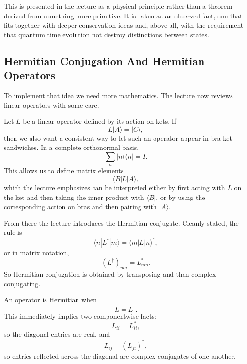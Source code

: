 This is presented in the lecture as a physical principle rather than a theorem derived from something more primitive. It is taken as an observed fact, one that fits together with deeper conservation ideas and, above all, with the requirement that quantum time evolution not destroy distinctions between states.

\subsection{Hermitian Conjugation And Hermitian Operators}

To implement that idea we need more mathematics. The lecture now reviews linear operators with some care.

Let $L$ be a linear operator defined by its action on kets. If
\begin{equation}
L|A\rangle=|C\rangle,
\end{equation}
then we also want a consistent way to let such an operator appear in bra-ket sandwiches. In a complete orthonormal basis,
\begin{equation}
\sum_n |n\rangle\langle n|=I.
\end{equation}
This allows us to define matrix elements
\begin{equation}
\langle B|L|A\rangle,
\end{equation}
which the lecture emphasizes can be interpreted either by first acting with $L$ on the ket and then taking the inner product with $\langle B|$, or by using the corresponding action on bras and then pairing with $|A\rangle$.

From there the lecture introduces the Hermitian conjugate. Cleanly stated, the rule is
\begin{equation}
\langle n|L^\dagger|m\rangle=\langle m|L|n\rangle^*,
\end{equation}
or in matrix notation,
\begin{equation}
(L^\dagger)_{nm}=L_{mn}^*.
\end{equation}
So Hermitian conjugation is obtained by transposing and then complex conjugating.

An operator is Hermitian when
\begin{equation}
L=L^\dagger.
\end{equation}
This immediately implies two componentwise facts:
\begin{equation}
L_{ii}=L_{ii}^*,
\end{equation}
so the diagonal entries are real, and
\begin{equation}
L_{ij}=(L_{ji})^*,
\end{equation}
so entries reflected across the diagonal are complex conjugates of one another.

